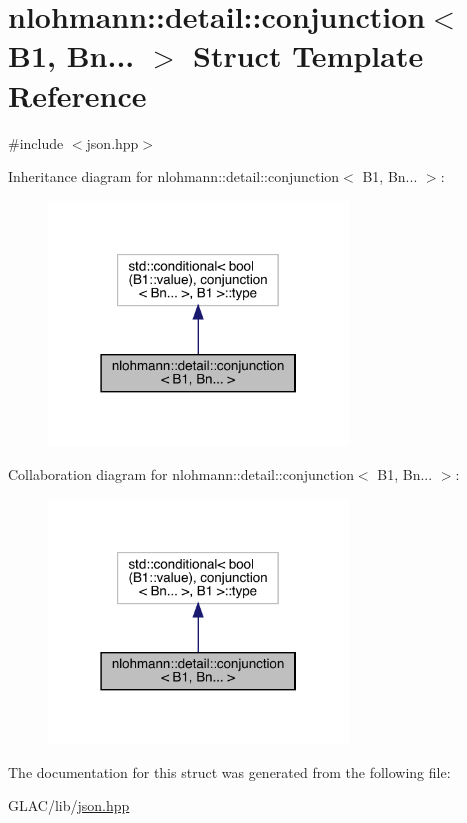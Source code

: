 \hypertarget{structnlohmann_1_1detail_1_1conjunction_3_01_b1_00_01_bn_8_8_8_01_4}{}\section{nlohmann\+::detail\+::conjunction$<$ B1, Bn... $>$ Struct Template Reference}
\label{structnlohmann_1_1detail_1_1conjunction_3_01_b1_00_01_bn_8_8_8_01_4}


{\ttfamily \#include $<$json.\+hpp$>$}



Inheritance diagram for nlohmann\+::detail\+::conjunction$<$ B1, Bn... $>$\+:
\nopagebreak
\begin{figure}[H]
\begin{center}
\leavevmode
\includegraphics[width=226pt]{structnlohmann_1_1detail_1_1conjunction_3_01_b1_00_01_bn_8_8_8_01_4__inherit__graph}
\end{center}
\end{figure}


Collaboration diagram for nlohmann\+::detail\+::conjunction$<$ B1, Bn... $>$\+:
\nopagebreak
\begin{figure}[H]
\begin{center}
\leavevmode
\includegraphics[width=226pt]{structnlohmann_1_1detail_1_1conjunction_3_01_b1_00_01_bn_8_8_8_01_4__coll__graph}
\end{center}
\end{figure}


The documentation for this struct was generated from the following file\+:\begin{DoxyCompactItemize}
\item 
G\+L\+A\+C/lib/\mbox{\hyperlink{json_8hpp}{json.\+hpp}}\end{DoxyCompactItemize}
